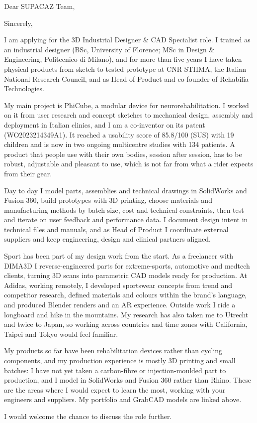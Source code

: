 \documentclass[11pt,a4paper,sans]{moderncv}
\begin{document}

\opening{Dear SUPACAZ Team,}
\closing{Sincerely,}
\makelettertitle

I am applying for the 3D Industrial Designer \& CAD Specialist role. I trained as an industrial designer (BSc, University of Florence; MSc in Design \& Engineering, Politecnico di Milano), and for more than five years I have taken physical products from sketch to tested prototype at CNR-STIIMA, the Italian National Research Council, and as Head of Product and co-founder of Rehabilia Technologies.

My main project is PhiCube, a modular device for neurorehabilitation. I worked on it from user research and concept sketches to mechanical design, assembly and deployment in Italian clinics, and I am a co-inventor on its patent (WO2023214349A1). It reached a usability score of 85.8/100 (SUS) with 19 children and is now in two ongoing multicentre studies with 134 patients. A product that people use with their own bodies, session after session, has to be robust, adjustable and pleasant to use, which is not far from what a rider expects from their gear.

Day to day I model parts, assemblies and technical drawings in SolidWorks and Fusion 360, build prototypes with 3D printing, choose materials and manufacturing methods by batch size, cost and technical constraints, then test and iterate on user feedback and performance data. I document design intent in technical files and manuals, and as Head of Product I coordinate external suppliers and keep engineering, design and clinical partners aligned.

Sport has been part of my design work from the start. As a freelancer with DIMA3D I reverse-engineered parts for extreme-sports, automotive and medtech clients, turning 3D scans into parametric CAD models ready for production. At Adidas, working remotely, I developed sportswear concepts from trend and competitor research, defined materials and colours within the brand's language, and produced Blender renders and an AR experience. Outside work I ride a longboard and hike in the mountains. My research has also taken me to Utrecht and twice to Japan, so working across countries and time zones with California, Taipei and Tokyo would feel familiar.

My products so far have been rehabilitation devices rather than cycling components, and my production experience is mostly 3D printing and small batches: I have not yet taken a carbon-fibre or injection-moulded part to production, and I model in SolidWorks and Fusion 360 rather than Rhino. These are the areas where I would expect to learn the most, working with your engineers and suppliers. My portfolio and GrabCAD models are linked above.

I would welcome the chance to discuss the role further.

\makeletterclosing
\end{document}
